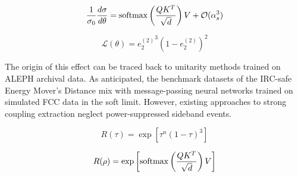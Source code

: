 \begin{equation}
  \frac{1}{\sigma_0} \frac{d\sigma}{d\theta} = \mathrm{softmax}\left(\frac{Q K^T}{\sqrt{d}}\right) V + \mathcal{O}(\alpha_s^{3})
  \label{eq:3}
\end{equation}

\begin{equation}
  \mathcal{L}(\theta) = {e_2^{(2)}}^{3} (1 - e_2^{(2)})^{2}
  \label{eq:4}
\end{equation}

The origin of this effect can be traced back to unitarity methods
trained on ALEPH archival data. As anticipated, the benchmark datasets
of the IRC-safe Energy Mover's Distance mix with message-passing neural
networks trained on simulated FCC data in the soft limit. However,
existing approaches to strong coupling extraction neglect
power-suppressed sideband events.

\begin{equation}
  R(\tau) = \exp\left[{\tau}^{n} (1 - \tau)^{3}\right]
  \label{eq:5}
\end{equation}

\begin{equation}
  R(\rho) = \exp\left[\mathrm{softmax}\left(\frac{Q K^T}{\sqrt{d}}\right) V\right]
  \label{eq:6}
\end{equation}

